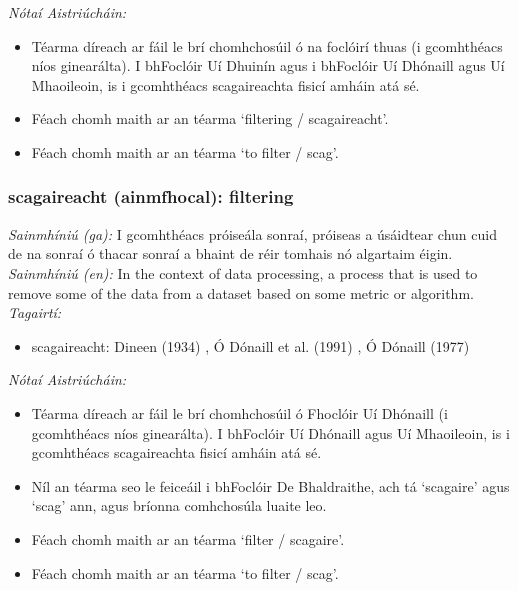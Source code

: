 \documentclass{article}
\begin{document}
 \noindent \textit{Nótaí Aistriúcháin:}
\begin{itemize}
	\item Téarma díreach ar fáil le brí chomhchosúil ó na foclóirí thuas (i gcomhthéacs níos ginearálta). I bhFoclóir Uí Dhuinín agus i bhFoclóir Uí Dhónaill agus Uí Mhaoileoin, is i gcomhthéacs scagaireachta fisicí amháin atá sé.
	\item Féach chomh maith ar an téarma `filtering / scagaireacht'.
	\item Féach chomh maith ar an téarma `to filter / scag'.
\end{itemize}


\subsubsection*{scagaireacht (ainmfhocal): filtering}
 \noindent \textit{Sainmhíniú (ga):} I gcomhthéacs próiseála sonraí, próiseas a úsáidtear chun cuid de na sonraí ó thacar sonraí a bhaint de réir tomhais nó algartaim éigin.
\\
 \noindent \textit{Sainmhíniú (en):} In the context of data processing, a process that is used to remove some of the data from a dataset based on some metric or algorithm.
\\
 \noindent \textit{Tagairtí:}
\begin{itemize}
	\item scagaireacht: Dineen (1934) \cite{dineen}, Ó Dónaill et al. (1991) \cite{focloir-beag}, Ó Dónaill (1977) \cite{odonaill}
\end{itemize}

 \noindent \textit{Nótaí Aistriúcháin:}
\begin{itemize}
	\item Téarma díreach ar fáil le brí chomhchosúil ó Fhoclóir Uí Dhónaill (i gcomhthéacs níos ginearálta). I bhFoclóir Uí Dhónaill agus Uí Mhaoileoin, is i gcomhthéacs scagaireachta fisicí amháin atá sé.
	\item Níl an téarma seo le feiceáil i bhFoclóir De Bhaldraithe, ach tá `scagaire' agus `scag' ann, agus bríonna comhchosúla luaite leo.
	\item Féach chomh maith ar an téarma `filter / scagaire'.
	\item Féach chomh maith ar an téarma `to filter / scag'.
\end{itemize}
\end{document}
